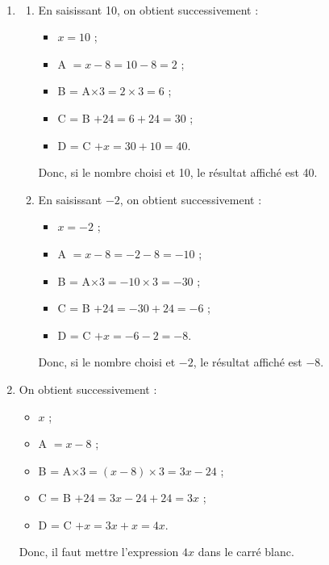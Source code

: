 \begin{corrige}
\ \\ [-5mm]
\begin{enumerate}
   \item
   \begin{enumerate}
      \item En saisissant 10, on obtient successivement :
      \begin{itemize}
         \item $x =10$ ;
         \item A $= x-8 =10-8 =2$ ;
         \item B = A$\times3 =2\times3 =6$ ;
         \item C =  B $+24 =6+24 =30$ ;
         \item D = C $+x =30+10 =40$.
      \end{itemize}
      Donc, {\blue si le nombre choisi et 10, le résultat affiché est 40}.
      \item En saisissant $-2$, on obtient successivement :
      \begin{itemize}
         \item $x =-2$ ;
         \item A $= x-8 =-2-8 =-10$ ;
         \item B = A$\times3 =-10\times3 =-30$ ;
         \item C = B $+24 =-30+24 =-6$ ;
         \item D = C $+x =-6-2 =-8$.
      \end{itemize}
      Donc, {\blue si le nombre choisi et $-2$, le résultat affiché est $-8$}.
   \end{enumerate}
   \item On obtient successivement :
      \begin{itemize}
         \item $x$ ;
         \item A $= x-8$ ;
         \item B = A$\times3 =(x-8)\times3 =3x-24$ ;
         \item C = B $+24 =3x-24+24 =3x$ ;
         \item D = C $+x =3x+x =4x$.
      \end{itemize}
      Donc, {\blue il faut mettre l'expression $4x$ dans le carré blanc}.
\end{enumerate}
\end{corrige}

\bigskip


